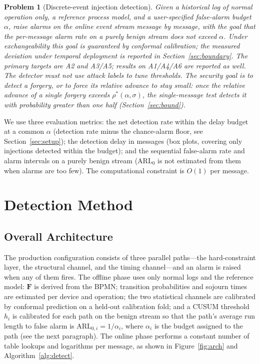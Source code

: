 \documentclass[manuscript,screen,review]{acmart}
\newtheorem{problem}{Problem}
\begin{document}
\begin{problem}[Discrete-event injection detection]
\label{prob:detect}
Given a historical log of normal operation only, a reference process model, and a user-specified false-alarm budget $\alpha$, raise alarms on the online event stream message by message, with the goal that the per-message alarm rate on a purely benign stream does not exceed $\alpha$. Under exchangeability this goal is guaranteed by conformal calibration; the measured deviation under temporal deployment is reported in Section~\ref{sec:boundary}. The primary targets are {A2} and {A3}/{A5}; results on {A1}/{A4}/{A6} are reported as well. The detector must not use attack labels to tune thresholds. The security goal is \emph{to detect a forgery, or to force its relative advance to stay small}: once the relative advance of a single forgery exceeds $\rho^*(\alpha,\sigma)$, the single-message test detects it with probability greater than one half (Section~\ref{sec:bound}).
\end{problem}

We use three evaluation metrics: the net detection rate within the delay budget at a common $\alpha$ (detection rate minus the chance-alarm floor, see Section~\ref{sec:setup}); the detection delay in messages (box plots, covering only injections detected within the budget); and the sequential false-alarm rate and alarm intervals on a purely benign stream ($\mathrm{ARL}_0$ is not estimated from them when alarms are too few). The computational constraint is $O(1)$ per message.

\section{Detection Method}
\label{sec:framework}

\subsection{Overall Architecture}
\label{sec:arch}

The production configuration consists of three parallel paths---the hard-constraint layer, the structural channel, and the timing channel---and an alarm is raised when any of them fires. The offline phase uses only normal logs and the reference model: $\mathbf F$ is derived from the {BPMN}; transition probabilities and sojourn times are estimated per device and operation; the two statistical channels are calibrated by conformal prediction on a held-out calibration fold; and a {CUSUM} threshold $h_i$ is calibrated for each path on the benign stream so that the path's average run length to false alarm is $\mathrm{ARL}_{0,i}=1/\alpha_i$, where $\alpha_i$ is the budget assigned to the path (see the next paragraph). The online phase performs a constant number of table lookups and logarithms per message, as shown in Figure~\ref{fig:arch} and Algorithm~\ref{alg:detect}.
\end{document}
